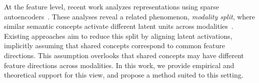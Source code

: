 At the feature level, recent work analyzes representations using sparse autoencoders~\citep{zaigrajew2025interpreting, papadimitriou2025interpreting}.
These analyses reveal a related phenomenon, \emph{modality split}, where similar semantic concepts activate different latent units across modalities~\citep{kaushik2026learning, dhimoila2026crossmodal}.
Existing approaches aim to reduce this split by aligning latent activations, implicitly assuming that shared concepts correspond to common feature directions.
This assumption overlooks that shared concepts may have different feature directions across modalities.
In this work, we provide empirical and theoretical support for this view, and propose a method suited to this setting.
